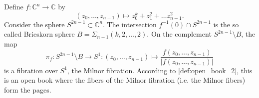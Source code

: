 Define $f\colon \mathbb C^n \to \mathbb C$ by
\[
    (z_0, \dots, z_{n-1}) \mapsto z_0^k + z_1^2 + \dots z_{n-1}^2.  
\]
Consider the sphere $S^{2n-1} \subset \mathbb C^n$.
The intersection $f^{-1}(0) \cap S^{2n-1}$ is the so called Brieskorn sphere $B = \Sigma_{n-1}(k,2,\dots,2)$.
On the complement $S^{2n-1} \setminus B$, the map
\[
    \pi_f\colon S^{2n-1}\setminus B \to S^1\colon (z_0, \dots, z_{n-1}) \mapsto \frac{f(z_0, \dots, z_{n-1})}{|f(z_0, \dots, z_{n-1})|}
\]
is a fibration over $S^1$, the Milnor fibration.
According to \cref{def:open_book_2}, this is an open book where the fibers of the Milnor fibration (i.e. the Milnor fibers) form the pages.


